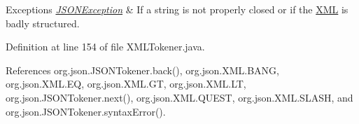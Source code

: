 \begin{DoxyExceptions}{Exceptions}
{\em \hyperlink{classorg_1_1json_1_1_j_s_o_n_exception}{J\-S\-O\-N\-Exception}} & If a string is not properly closed or if the \hyperlink{classorg_1_1json_1_1_x_m_l}{X\-M\-L} is badly structured. \\
\hline
\end{DoxyExceptions}


Definition at line 154 of file X\-M\-L\-Tokener.\-java.



References org.\-json.\-J\-S\-O\-N\-Tokener.\-back(), org.\-json.\-X\-M\-L.\-B\-A\-N\-G, org.\-json.\-X\-M\-L.\-E\-Q, org.\-json.\-X\-M\-L.\-G\-T, org.\-json.\-X\-M\-L.\-L\-T, org.\-json.\-J\-S\-O\-N\-Tokener.\-next(), org.\-json.\-X\-M\-L.\-Q\-U\-E\-S\-T, org.\-json.\-X\-M\-L.\-S\-L\-A\-S\-H, and org.\-json.\-J\-S\-O\-N\-Tokener.\-syntax\-Error().



